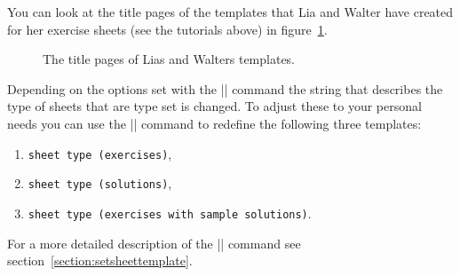 \documentclass[a4paper,fleqn]{report}
\begin{document}
\noindent You can look at the title pages of the templates that Lia
and Walter have created for her exercise sheets (see the tutorials
above) in figure~\ref{fig:template_title_pages}.

\begin{figure}[htbp]
  \centering
  \quad
  \caption{The title pages of Lias and Walters templates.}
  \label{fig:template_title_pages}
\end{figure}

Depending on the options set with the |\sheetconf| command the string
that describes the type of sheets that are type set is changed. To
adjust these to your personal needs you can use the
|\setsheettemplate| command to redefine the following three templates:
\begin{enumerate}
  \item \lstinline[language={}]|sheet type (exercises)|,
  \item \lstinline[language={}]|sheet type (solutions)|,
  \item \lstinline[language={}]|sheet type (exercises with sample solutions)|.
\end{enumerate}
For a more detailed description of the |\setsheettemplate| command see
section~\ref{section:setsheettemplate}.
\end{document}
